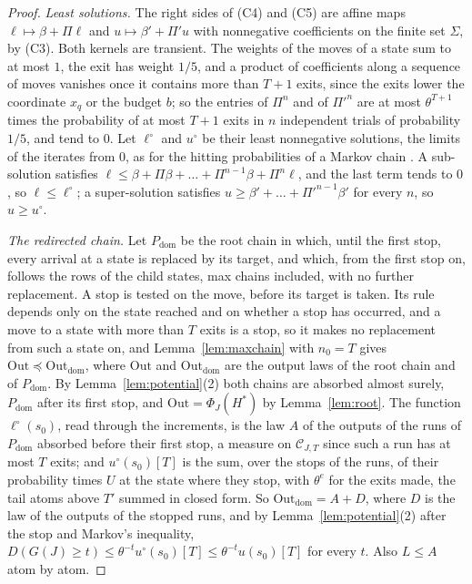 \documentclass[11pt]{amsart}
\theoremstyle{definition}
\numberwithin{equation}{section}
\newcommand{\cC}{\mathcal{C}}
\newcommand{\stle}{\preceq}
\begin{document}
\begin{proof}
\emph{Least solutions.} The right sides of (C4) and (C5) are affine maps $\ell\mapsto\beta+\Pi\ell$ and $u\mapsto\beta'+\Pi'u$ with nonnegative coefficients on the finite set $\Sigma$, by (C3). Both kernels are transient. The weights of the moves of a state sum to at most $1$, the exit has weight $1/5$, and a product of coefficients along a sequence of moves vanishes once it contains more than $T+1$ exits, since the exits lower the coordinate $x_q$ or the budget $b$; so the entries of $\Pi^n$ and of $\Pi'^n$ are at most $\theta^{T+1}$ times the probability of at most $T+1$ exits in $n$ independent trials of probability $1/5$, and tend to $0$. Let $\ell^\circ$ and $u^\circ$ be their least nonnegative solutions, the limits of the iterates from $0$, as for the hitting probabilities of a Markov chain \cite[Theorem~1.3.2]{Nor97}. A sub-solution satisfies $\ell\le\beta+\Pi\beta+\dots+\Pi^{n-1}\beta+\Pi^n\ell$, and the last term tends to $0$, so $\ell\le\ell^\circ$; a super-solution satisfies $u\ge\beta'+\dots+\Pi'^{n-1}\beta'$ for every $n$, so $u\ge u^\circ$.

\emph{The redirected chain.} Let $P_{\mathrm{dom}}$ be the root chain in which, until the first stop, every arrival at a state is replaced by its target, and which, from the first stop on, follows the rows of the child states, max chains included, with no further replacement. A stop is tested on the move, before its target is taken. Its rule depends only on the state reached and on whether a stop has occurred, and a move to a state with more than $T$ exits is a stop, so it makes no replacement from such a state on, and Lemma~\ref{lem:maxchain} with $n_0=T$ gives $\mathrm{Out}\stle\mathrm{Out}_{\mathrm{dom}}$, where $\mathrm{Out}$ and $\mathrm{Out}_{\mathrm{dom}}$ are the output laws of the root chain and of $P_{\mathrm{dom}}$. By Lemma~\ref{lem:potential}(2) both chains are absorbed almost surely, $P_{\mathrm{dom}}$ after its first stop, and $\mathrm{Out}=\Phi_J(H^*)$ by Lemma~\ref{lem:root}. The function $\ell^\circ(s_0)$, read through the increments, is the law $A$ of the outputs of the runs of $P_{\mathrm{dom}}$ absorbed before their first stop, a measure on $\cC_{J,T}$ since such a run has at most $T$ exits; and $u^\circ(s_0)[T]$ is the sum, over the stops of the runs, of their probability times $U$ at the state where they stop, with $\theta^e$ for the exits made, the tail atoms above $T'$ summed in closed form. So $\mathrm{Out}_{\mathrm{dom}}=A+D$, where $D$ is the law of the outputs of the stopped runs, and by Lemma~\ref{lem:potential}(2) after the stop and Markov's inequality, $D(G(J)\ge t)\le\theta^{-t}u^\circ(s_0)[T]\le\theta^{-t}u(s_0)[T]$ for every $t$. Also $L\le A$ atom by atom.


\end{proof}
\end{document}
